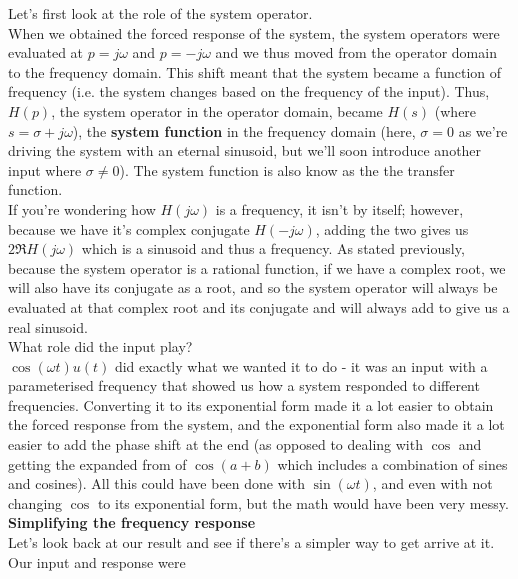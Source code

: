 \documentclass{report}
\begin{document}
Let's first look at the role of the system operator.\\
When we obtained the forced response of the system, the system operators were evaluated at $p = j\omega$ and $p = -j\omega$ and we thus moved from the operator domain to the frequency domain. This shift meant that the system became a function of frequency (i.e. the system changes based on the frequency of the input). Thus, $H(p)$, the system operator in the operator domain, became $H(s)$ (where $s = \sigma + j\omega$), the \textbf{system function} in the frequency domain (here, $\sigma = 0$ as we're driving the system with an eternal sinusoid, but we'll soon introduce another input where $\sigma \neq 0$). The system function is also know as the the transfer function. \smallskip \\
If you're wondering how $H(j\omega)$ is a frequency, it isn't by itself; however, because we have it's complex conjugate $H(-j\omega)$, adding the two gives us $2\Re{H(j\omega)}$ which is a sinusoid and thus a frequency. As stated previously, because the system operator is a rational function, if we have a complex root, we will also have its conjugate as a root, and so the system operator will always be evaluated at that complex root and its conjugate and will always add to give us a real sinusoid. \smallskip \\
What role did the input play? \\
$\cos(\omega t)u(t)$ did exactly what we wanted it to do - it was an input with a parameterised frequency that showed us how a system responded to different frequencies. Converting it to its exponential form made it a lot easier to obtain the forced response from the system, and the exponential form also made it a lot easier to add the phase shift at the end (as opposed to dealing with $\cos$ and getting the expanded from of $\cos(a + b)$ which includes a combination of sines and cosines). All this could have been done with $\sin(\omega t)$, and even with not changing $\cos$ to its exponential form, but the math would have been very messy. \smallskip \\
\textbf{Simplifying the frequency response} \\
Let's look back at our result and see if there's a simpler way to get arrive at it. Our input and response were 
\end{document}
